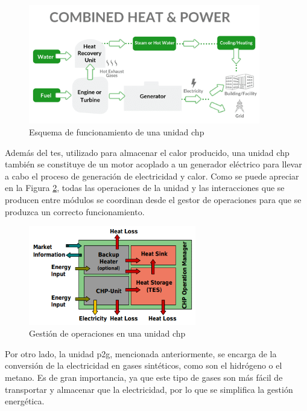 \begin{figure}[h!]
  \centering
  \includegraphics[width=0.9\textwidth]{img/teoria/chp.png}
  \caption{Esquema de funcionamiento de una unidad \acrshort{chp} \cite{chp}}
  \label{fig:chp}
\end{figure}

Además del \gls{tes}, utilizado para almacenar el calor producido, una unidad \gls{chp} también se constituye de un motor acoplado a un generador eléctrico para llevar a cabo el proceso de generación de electricidad y calor. Como se puede apreciar en la Figura \ref{fig:chp2}, todas las operaciones de la unidad y las interacciones que se producen entre módulos se coordinan desde el gestor de operaciones para que se produzca un correcto funcionamiento.

\begin{figure}[h!]
  \centering
  \includegraphics[width=0.65\textwidth]{img/teoria/chp2.png}
  \caption{Gestión de operaciones en una unidad \acrshort{chp} \cite{chp2}}
  \label{fig:chp2}
\end{figure}

Por otro lado, la unidad \gls{p2g}, mencionada anteriormente, se encarga de la conversión de la electricidad en gases sintéticos, como son el hidrógeno o el metano. Es de gran importancia, ya que este tipo de gases son más fácil de transportar y almacenar que la electricidad, por lo que se simplifica la gestión energética. \cite{transactive}

